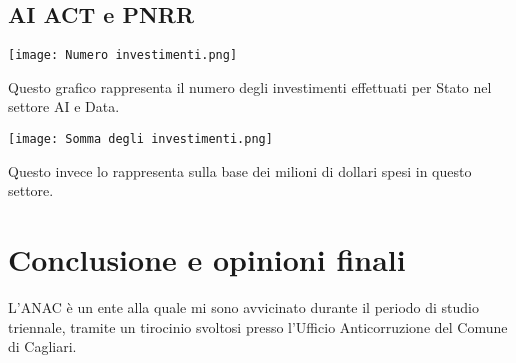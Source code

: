\documentclass{article}
\begin{document}
\subsection{AI ACT e PNRR}
\begin{center}
    \texttt{[image: Numero investimenti.png]}
\end{center}
\begin{justify}
    Questo grafico rappresenta il numero degli investimenti effettuati per Stato nel settore AI e Data.
\end{justify}

\begin{center}
    \texttt{[image: Somma degli investimenti.png]}
\end{center}
\begin{justify}
    Questo invece lo rappresenta sulla base dei milioni di dollari spesi in questo settore.
\end{justify}

\newpage \centering
\section{Conclusione e opinioni finali}
\begin{justify}
    L'ANAC è un ente alla quale mi sono avvicinato durante il periodo di studio triennale, tramite un tirocinio svoltosi presso l'Ufficio Anticorruzione del Comune di Cagliari. 
\end{justify}

\begin{justify}
    
    
\end{justify}
\end{document}
